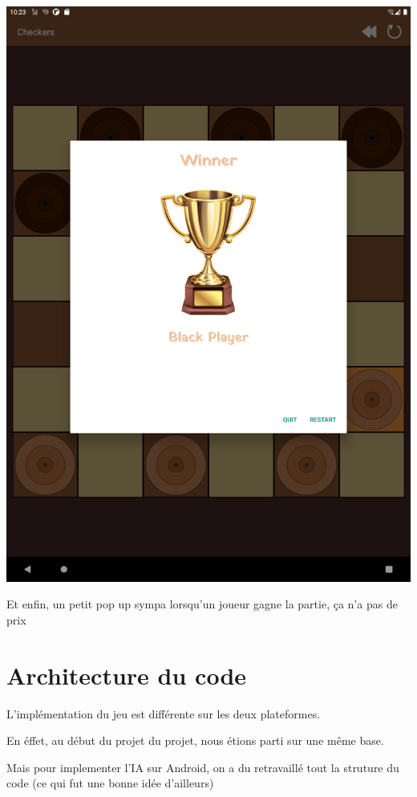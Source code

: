\documentclass{article}
\begin{document}
\begin{enumerate}
\begin{center}
  \includegraphics[scale=0.1]{pop_up_victoire_tablet.png}
\end{center}

\end{enumerate}

Et enfin, un petit pop up sympa lorsqu'un joueur gagne la partie, ça n'a pas de prix

\section{Architecture du code}

L'implémentation du jeu est différente sur les deux plateformes.

En éffet, au début du projet du projet, nous étions parti sur une même base.

Mais pour implementer l'IA sur Android, on a du retravaillé tout la struture du code
 (ce qui fut une bonne idée d'ailleurs)
\end{document}
